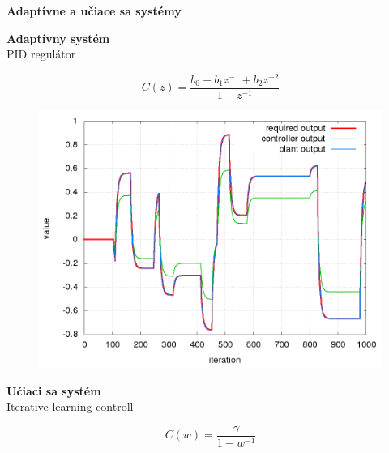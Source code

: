 \documentclass[xcolor=dvipsnames]{beamer}
\begin{document}
\begin{frame}{\bf Adaptívne a učiace sa systémy}
\begin{minipage}{.5\textwidth}

  {\bf Adaptívny systém} \\
  PID regulátor

  \begin{equation} \label{eu_eqn}
  C(z) = \frac{b_{0} + b_{1}z^{-1} + b_{2}z^{-2}}{1 - z^{-1}} \nonumber
  \end{equation}

  \begin{figure}[!htb]
  \includegraphics[scale=.15]{../pid_ilc/pid_result.png}
  \end{figure}

\end{minipage}%
\begin{minipage}{.5\textwidth}

  {\bf Učiaci sa systém} \\
  Iterative learning controll

  \begin{equation} \label{eu_eqn}
  C(w) = \frac{\gamma}{1 - w^{-1}} \nonumber
  \end{equation}


\end{minipage}
\end{frame}
\end{document}
